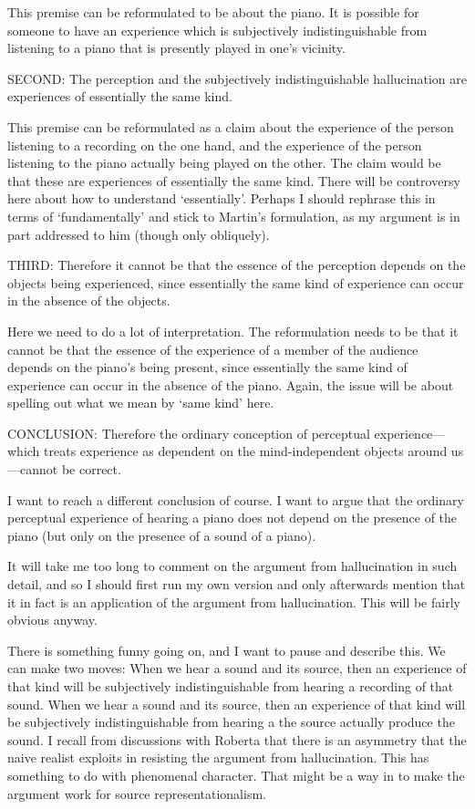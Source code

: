 \documentclass[sloppy, journal, git, bytitle, dodraft]{humapap}
\begin{document}
This premise can be reformulated to be about the piano. It is possible for someone to have an experience which is subjectively indistinguishable from listening to a piano that is presently played in one's vicinity. 

SECOND: The perception and the subjectively indistinguishable hallucination are experiences of essentially the same kind.

This premise can be reformulated as a claim about the experience of the person listening to a recording on the one hand, and the experience of the person listening to the piano actually being played on the other. The claim would be that these are experiences of essentially the same kind. There will be controversy here about how to understand `essentially'. Perhaps I should rephrase this in terms of `fundamentally' and stick to Martin's formulation, as my argument is in part addressed to him (though only obliquely).

THIRD: Therefore it cannot be that the essence of the perception depends on the objects being experienced, since essentially the same kind of experience can occur in the absence of the objects.

Here we need to do a lot of interpretation. The reformulation needs to be that it cannot be that the essence of the experience of a member of the audience depends on the piano's being present, since essentially the same kind of experience can occur in the absence of the piano. Again, the issue will be about spelling out what we mean by `same kind' here.

CONCLUSION: Therefore the ordinary conception of perceptual experience—which treats experience as dependent on the mind-independent objects around us—cannot be correct.

I want to reach a different conclusion of course. I want to argue that the ordinary perceptual experience of hearing a piano does not depend on the presence of the piano (but only on the presence of a sound of a piano). 

It will take me too long to comment on the argument from hallucination in such detail, and so I should first run my own version and only afterwards mention that it in fact is an application of the argument from hallucination. This will be fairly obvious anyway.

There is something funny going on, and I want to pause and describe this. We can make two moves: 
When we hear a sound and its source, then an experience of that kind will be subjectively indistinguishable from hearing  a recording of that sound. 
When we hear a sound and its source, then an experience of that kind will be subjectively indistinguishable from hearing a the source actually produce the sound.
I recall from discussions with Roberta that there is an asymmetry that the naive realist exploits in resisting the argument from hallucination. This has something to do with phenomenal character. That might be a way in to make the argument work for source representationalism. 
\end{document}
